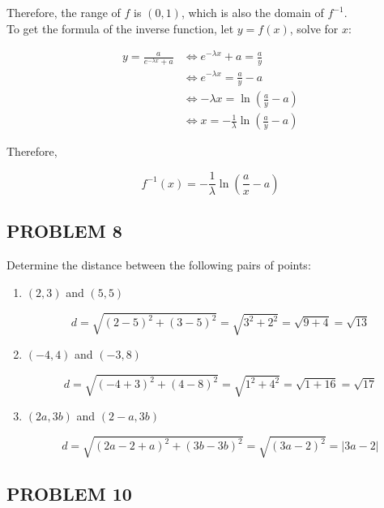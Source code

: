 \documentclass{article}
\begin{document}
\begin{enumerate}[label=(\alph*)]
Therefore, the range of $f$ is $(0,1)$, which is also the domain of $f^{-1}$. \\

To get the formula of the inverse function, let $y = f(x)$, solve for $x$:

\begin{equation*}
\begin{aligned}
y = \frac{a}{e^{-\lambda x} + a} &\iff
e^{-\lambda x} + a = \frac{a}{y} \\ &\iff
e^{-\lambda x} = \frac{a}{y} - a \\ &\iff
-\lambda x = \ln{(\frac{a}{y} - a)} \\ &\iff
x = -\frac{1}{\lambda}\ln{(\frac{a}{y} - a)}
\end{aligned}
\end{equation*}

Therefore,

$$ f^{-1}(x) = -\frac{1}{\lambda}\ln{(\frac{a}{x} - a)} $$

\end{enumerate}


\subsection*{PROBLEM 8}

Determine the distance between the following pairs of points:

\begin{enumerate}[label=(\alph*)]

\item $(2,3)$ and $(5,5)$

$$ d = \sqrt{(2-5)^2 + (3-5)^2} = \sqrt{3^2 + 2^2} = \sqrt{9 + 4} = \sqrt{13} $$

\item $(-4,4)$ and $(-3,8)$

$$ d = \sqrt{(-4+3)^2 + (4-8)^2} = \sqrt{1^2 + 4^2} = \sqrt{1 + 16} = \sqrt{17} $$

\item $(2a,3b)$ and $(2-a,3b)$

$$ d = \sqrt{(2a-2+a)^2 + (3b-3b)^2} = \sqrt{(3a-2)^2} = |3a-2| $$

\end{enumerate}


\subsection*{PROBLEM 10}
\end{document}
